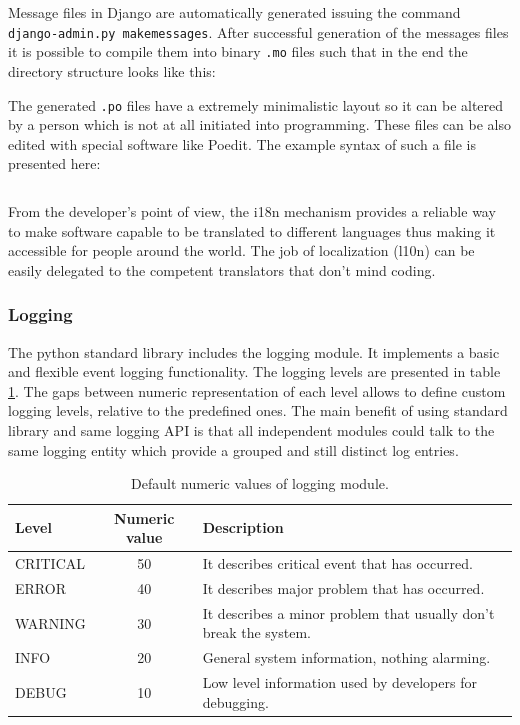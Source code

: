 \documentclass[12pt,oneside,a4paper]{article}
\begin{document}
Message files in Django are automatically generated issuing the command \texttt{django-admin.py makemessages}. After successful generation of the messages files it is possible to compile them into binary \texttt{.mo} files such that in the end the directory structure looks like this:

The generated \texttt{.po} files have a extremely minimalistic layout so it can be altered by a person which is not at all initiated into programming. These files can be also edited with special software like Poedit. The example syntax of such a file is presented here:
\inputminted[linenos,baselinestretch=1,xleftmargin=0.5cm]{python}{src/i18n-2.py}

From the developer's point of view, the i18n mechanism provides a reliable way to make software capable to be translated to different languages thus making it accessible for people around the world. The job of localization (l10n) can be easily delegated to the competent translators that don't mind coding.

\subsubsection{Logging}
The python standard library includes the logging module. It implements a basic and flexible event logging functionality. The logging levels are presented in table \ref{table:default-logging-levels}. The gaps between numeric representation of each level allows to define custom logging levels, relative to the predefined ones. The main benefit of using standard library and same logging API is that all independent modules could talk to the same logging entity which provide a grouped and still distinct log entries. 
\begin{table}[h]
  \begin{center}
    \begin{tabular}{ l | c | l}
      \hline
      Level     & Numeric value & Description \\
      \hline
      \hline
      CRITICAL  & 50            & It describes critical event that has occurred. \\
      ERROR     & 40            & It describes major problem that has occurred. \\
      WARNING   & 30            & It describes a minor problem that usually don't break the system. \\
      INFO      & 20            & General system information, nothing alarming. \\
      DEBUG     & 10            & Low level information used by developers for debugging. \\
      \hline
    \end{tabular}
  \end{center}
  \caption{Default numeric values of logging module.}
  \label{table:default-logging-levels}
\end{table}
\end{document}
